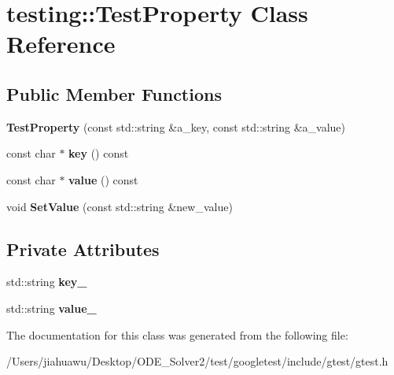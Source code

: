 \hypertarget{classtesting_1_1_test_property}{}\section{testing\+:\+:Test\+Property Class Reference}
\label{classtesting_1_1_test_property}
\subsection*{Public Member Functions}
\begin{DoxyCompactItemize}
\item 
\mbox{\label{classtesting_1_1_test_property_a25a0ccf1c75a92af46a48d3c2a873e6d}} 
{\bfseries Test\+Property} (const std\+::string \&a\+\_\+key, const std\+::string \&a\+\_\+value)
\item 
\mbox{\label{classtesting_1_1_test_property_ad60435d4ad04ac030487d8998fc61c5f}} 
const char $\ast$ {\bfseries key} () const
\item 
\mbox{\label{classtesting_1_1_test_property_ad423a07af33c88b0c9ed33ee74815a63}} 
const char $\ast$ {\bfseries value} () const
\item 
\mbox{\label{classtesting_1_1_test_property_a377245335d9f614cd06d1650e3358e1d}} 
void {\bfseries Set\+Value} (const std\+::string \&new\+\_\+value)
\end{DoxyCompactItemize}
\subsection*{Private Attributes}
\begin{DoxyCompactItemize}
\item 
\mbox{\label{classtesting_1_1_test_property_a948544067d61e790bd37e234186fa708}} 
std\+::string {\bfseries key\+\_\+}
\item 
\mbox{\label{classtesting_1_1_test_property_a204e3793205a1e61412fc34be1913c01}} 
std\+::string {\bfseries value\+\_\+}
\end{DoxyCompactItemize}


The documentation for this class was generated from the following file\+:\begin{DoxyCompactItemize}
\item 
/\+Users/jiahuawu/\+Desktop/\+O\+D\+E\+\_\+\+Solver2/test/googletest/include/gtest/gtest.\+h\end{DoxyCompactItemize}
